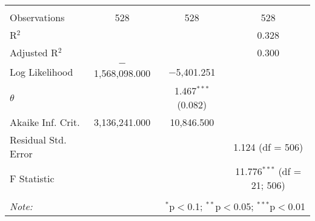 \begin{table}[!htbp]
\begin{tabular}{@{\extracolsep{5pt}}lccc}
 \hline \\[-1.8ex] 
Observations & 528 & 528 & 528 \\ 
R$^{2}$ &  &  & 0.328 \\ 
Adjusted R$^{2}$ &  &  & 0.300 \\ 
Log Likelihood & $-$1,568,098.000 & $-$5,401.251 &  \\ 
$\theta$ &  & 1.467$^{***}$  (0.082) &  \\ 
Akaike Inf. Crit. & 3,136,241.000 & 10,846.500 &  \\ 
Residual Std. Error &  &  & 1.124 (df = 506) \\ 
F Statistic &  &  & 11.776$^{***}$ (df = 21; 506) \\ 
\hline 
\hline \\[-1.8ex] 
\textit{Note:}  & \multicolumn{3}{r}{$^{*}$p$<$0.1; $^{**}$p$<$0.05; $^{***}$p$<$0.01} \\ 
\end{tabular} 
\end{table} 
